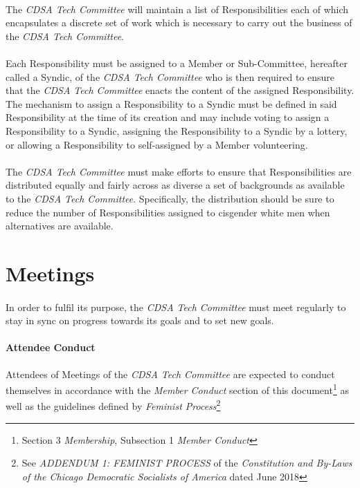 \documentclass[12pt,letter,twocolumn,oneside,draft]{article}
\newcommand{\cname}{\emph{CDSA Tech Committee}}
\begin{document}
\paragraph{}
The \cname{} will maintain a list of Responsibilities each of which
encapsulates a discrete set of work which is necessary to carry out the
business of the \cname{}.

\paragraph{}
Each Responsibility must be assigned to a Member or Sub-Committee, hereafter
called a Syndic, of the \cname{} who is then required to ensure that the
\cname{} enacts the content of the assigned Responsibility. The mechanism to
assign a Responsibility to a Syndic must be defined in said Responsibility at
the time of its creation and may include voting to assign a Responsibility to a
Syndic, assigning the Responsibility to a Syndic by a lottery, or allowing a
Responsibility to self-assigned by a Member volunteering.

\paragraph{}
The \cname{} must make efforts to ensure that Responsibilities are distributed
equally and fairly across as diverse a set of backgrounds as available to the
\cname{}.  Specifically, the distribution should be sure to reduce the number
of Responsibilities assigned to cisgender white men when alternatives are
available.


\section{Meetings}

\paragraph{}
In order to fulfil its purpose, the \cname{} must meet regularly to stay in
sync on progress towards its goals and to set new goals.

\paragraph{Attendee Conduct}
Attendees of Meetings of the \cname{} are expected to conduct themselves in
accordance with the \emph{Member Conduct} section of this
document\footnote{Section 3 \emph{Membership}, Subsection 1 \emph{Member
Conduct}} as well as the guidelines defined by \emph{Feminist
Process}\footnote{See \emph{ADDENDUM 1: FEMINIST PROCESS} of the
\emph{Constitution and By-Laws of the Chicago Democratic Socialists of America}
dated June 2018}
\end{document}
